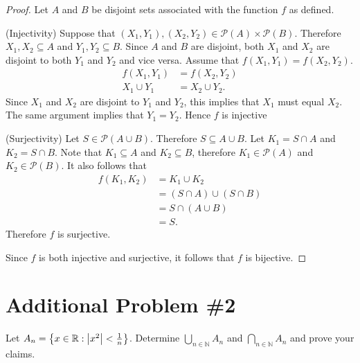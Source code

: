 \documentclass[12pt]{extarticle}
\newcommand{\powerset}[1]{\mathcal{P}(#1)}
\begin{document}
\begin{proof}
	Let $A$ and $B$ be disjoint sets associated with the function $f$ as defined.
	\hfill\linebreak

	\quad\begin{minipage}{\dimexpr\textwidth-1cm}
	(Injectivity) \quad Suppose that $(X_1, Y_1), (X_2, Y_2) \in \powerset{A} \times \powerset{B}$. Therefore $X_1, X_2 \subseteq A$ and $Y_1,Y_2 \subseteq B$. Since $A$ and $B$ are disjoint, both $X_1$ and $X_2$ are disjoint to both $Y_1$ and $Y_2$ and vice versa. Assume that $f(X_1, Y_1) = f(X_2, Y_2)$.
	\begin{align*}
		f(X_1, Y_1) &= f(X_2, Y_2) \\
		X_1 \cup Y_1 &= X_2 \cup Y_2
	.\end{align*}
	Since $X_1$ and $X_2$ are disjoint to $Y_1$ and $Y_2$, this implies that $X_1$ must equal $X_2$. The same argument implies that $Y_1 = Y_2$. Hence $f$ is injective
	\end{minipage}

	\hfill\linebreak

	\quad\begin{minipage}{\dimexpr\textwidth-1cm}
		(Surjectivity) \quad Let $S \in \powerset{A \cup B}$. Therefore $S \subseteq A \cup B$. Let $K_1 = S \cap A$ and $K_2 = S \cap B$. Note that $K_1 \subseteq A$ and $K_2 \subseteq B$, therefore $K_1 \in \powerset{A}$ and $K_2 \in \powerset{B}$. It also follows that
		\begin{align*}
			f(K_1, K_2) &= K_1 \cup K_2 \\
			&= (S \cap A) \cup (S \cap B) \\
			&= S \cap (A \cup B) \\
			&= S
		.\end{align*}
	Therefore $f$ is surjective.
	\end{minipage}

	\hfill\linebreak

	Since $f$ is both injective and surjective, it follows that $f$ is bijective.
\end{proof}

\section*{Additional Problem \#2}

Let $A_n = \qty{x \in \mathbb{R} : \qty|x^2| < \frac{1}{n}}$. Determine $\bigcup_{n \in \mathbb{N}} A_n$ and $\bigcap_{n \in \mathbb{N}} A_n$ and prove your claims.
\end{document}
